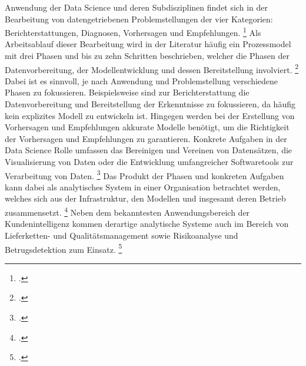 Anwendung der Data Science und deren Subdisziplinen findet sich in der Bearbeitung von datengetriebenen Problemstellungen der vier Kategorien: Berichterstattungen, Diagnosen, Vorhersagen und Empfehlungen. \footcite[Vgl.][S. 10]{vanderAalst.2016}
Als Arbeitsablauf dieser Bearbeitung wird in der Literatur häufig ein Prozessmodel mit drei Phasen und bis zu zehn Schritten beschrieben, welcher die Phasen der Datenvorbereitung, der Modellentwicklung und dessen Bereitstellung involviert. \footcite[Vgl.][S. 1]{Zhang.2020b}
Dabei ist es sinnvoll, je nach Anwendung und Problemstellung verschiedene Phasen zu fokussieren.
Beispielsweise sind zur Berichterstattung die Datenvorbereitung und Bereitstellung der Erkenntnisse zu fokussieren, da häufig kein explizites Modell zu entwickeln ist.
Hingegen werden bei der Erstellung von Vorhersagen und Empfehlungen akkurate Modelle benötigt, um die Richtigkeit der Vorhersagen und Empfehlungen zu garantieren.
Konkrete Aufgaben in der Data Science Rolle umfassen das Bereinigen und Vereinen von Datensätzen, die Visualisierung von Daten oder die Entwicklung umfangreicher Softwaretools zur Verarbeitung von Daten. \footcite[Vgl.][S. 13]{Patil.2011}
Das Produkt der Phasen und konkreten Aufgaben kann dabei als analytisches System in einer Organisation betrachtet werden, welches sich aus der Infrastruktur, den Modellen und insgesamt deren Betrieb zusammensetzt. \footcite[Vgl.][S. 22]{Grossman.2014}
Neben dem bekanntesten Anwendungsbereich der Kundenintelligenz kommen derartige analytische Systeme auch im Bereich von Lieferketten- und Qualitätsmanagement sowie Risikoanalyse und Betrugsdetektion zum Einsatz. \footcite[Vgl.][S. 221ff.]{Elgendy.2014}
